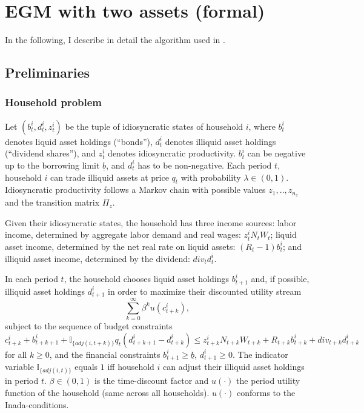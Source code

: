 \documentclass[11pt]{article} %
\begin{document}
\section{EGM with two assets (formal)}
In the following, I describe in detail the algorithm used in \cite{bayer19}.
\subsection{Preliminaries}
\subsubsection{Household problem}
Let $(b_t^i,d_t^i,z_t^i)$ be the tuple of idiosyncratic states of household $i$, where $b_t^i$ denotes liquid asset holdings (``bonds''), $d_t^i$ denotes illiquid asset holdings (``dividend shares''), and $z_t^i$ denotes idiosyncratic productivity. $b_t^i$ can be negative up to the borrowing limit $\underline{b}$, and $d_t^i$ has to be non-negative. Each period $t$, household $i$ can trade illiquid assets at price $q_t$ with probability $\lambda \in (0,1)$. Idiosyncratic productivity follows a Markov chain with possible values $z_1,..,z_{n_z}$ and the transition matrix $\Pi_z$.

Given their idiosyncratic states, the household has three income sources: labor income, determined by aggregate labor demand and real wages: $z_t^i N_t W_t$; liquid asset income, determined by the net real rate on liquid assets: $(R_t-1)b_t^i$; and illiquid asset income, determined by the dividend: $div_t d_t^i$.

In each period $t$, the household chooses liquid asset holdings $b_{t+1}^i$ and, if possible, illiquid asset holdings $d_{t+1}^i$ in order to maximize their discounted utility stream
\begin{equation}
\sum_{k=0}^{\infty} \beta^k u(c_{t+k}^i),
\end{equation}
subject to the sequence of budget constraints 
\begin{equation}c_{t+k}^i + b_{t+k+1}^i + \mathbb{I}_{\{adj(i,t+k)\}} q_t (d_{t+k+1}^i-d_{t+k}^i) \leq z_{t+k}^i N_{t+k}W_{t+k} + R_{t+k} b_{t+k}^i +  div_{t+k}d_{t+k}^i
\end{equation} for all $k\geq 0$, and the financial constraints $b_{t+1}^i\geq \underline{b}$, $d_{t+1}^i\geq 0$. The indicator variable $\mathbb{I}_{\{adj(i,t)\}}$ equals $1$ iff household $i$ can adjust their illiquid asset holdings in period $t$. $\beta\in (0,1)$ is the time-discount factor and $u(\cdot)$ the period utility function of the household (same across all households). $u(\cdot)$ conforms to the Inada-conditions.
\end{document}
